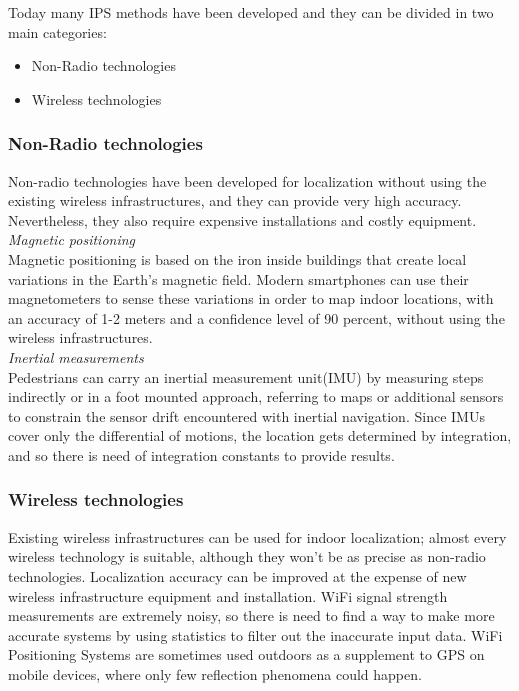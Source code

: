 Today many IPS methods have been developed and they can be divided in two main categories:

\begin{itemize}
\itemsep2pt
\item{
Non-Radio technologies
}
\item{
Wireless technologies
}
\end{itemize}

\subsubsection{Non-Radio technologies}

Non-radio technologies have been developed for localization without using the existing wireless infrastructures, and they can provide very high accuracy.
Nevertheless, they also require expensive installations and costly equipment.
\\

\textit{Magnetic positioning}
\\
Magnetic positioning is based on the iron inside buildings that create local variations in the Earth’s magnetic field.
Modern smartphones can use their magnetometers to sense these variations in order to map indoor locations, with an accuracy of 1-2 meters and a confidence level of 90 percent, without using the wireless infrastructures.
\\

\textit{Inertial measurements}
\\

Pedestrians can carry an inertial measurement unit(IMU) by measuring steps indirectly or in a foot mounted approach, referring to maps or additional sensors to constrain the sensor drift encountered with inertial navigation.
Since IMUs cover only the differential of motions, the location gets determined by integration, and so there is need of integration constants to provide results.

 
\subsubsection{Wireless technologies}

Existing wireless infrastructures can be used for indoor localization; almost every wireless technology is suitable, although they won't be as precise as non-radio technologies.
Localization accuracy can be improved at the expense of new wireless infrastructure equipment and installation.
WiFi signal strength measurements are extremely noisy, so there is need to find a way to make more accurate systems by using statistics to filter out the inaccurate input data. WiFi Positioning Systems are sometimes used outdoors as a supplement to GPS on mobile devices, where only few reflection phenomena could happen.
\\

